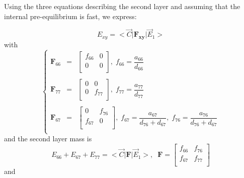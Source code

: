 \documentclass[aps,onecolumn,11pt]{revtex4}
\newcommand{\mymat}[1]{{\bm{#1}}}
\begin{document}
Using the three equations describing the second layer and assuming that the internal pre-equilibrium is fast, we express:

\begin{equation}
\boxed{
E_{xy} = <{\vec{C}} \vert \mymat{F_{xy}} \vert \vec{E}_1 >
}
\end{equation}
with
\begin{equation}
\left\lbrace
\begin{array}{rcl}
\mymat{F}_{66} & = & 
\begin{bmatrix}
	f_{66} & 0 \\
	0 & 0\\
\end{bmatrix}, \; f_{66} = \dfrac{a_{66}}{d_{66}}\\
\\
\mymat{F}_{77} & = & 
\begin{bmatrix}
	0 & 0 \\
	0 & f_{77}\\
\end{bmatrix}, \; f_{77} = \dfrac{a_{77}}{d_{77}}\\
\\
\mymat{F}_{67} & = & 
\begin{bmatrix}
	0 & f_{76}\\
	f_{67} & 0\\
\end{bmatrix}, \; f_{67} = \dfrac{a_{67}}{d_{76}+d_{67}},\; f_{76} = \dfrac{a_{76}}{d_{76}+d_{67}}\\
\end{array}
\right.
\end{equation}
and the second layer mass is
\begin{equation}
E_{66} + E_{67} + E_{77} = <{\vec{C}} \vert \mymat{F} \vert \vec{E}_1 >, \;\;
 \mymat{F} 
 = \begin{bmatrix}
	f_{66} & f_{76}\\
	f_{67} & f_{77}\\
\end{bmatrix}
\end{equation}
and
\end{document}
